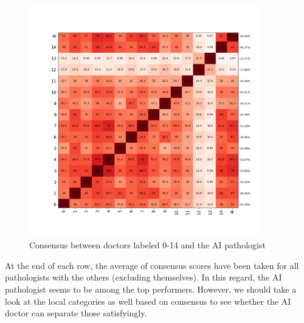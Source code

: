 \documentclass[a4paper,12pt]{article}
\begin{document}
\begin{figure}[H]
    \centering
    \includegraphics[width=0.9\textwidth]{results/consensus.png}
    \caption{Consensus between doctors labeled 0-14 and the AI pathologist}
    \label{fig:my_label}
\end{figure}

\vspace{4mm}

\par At the end of each row, the average of consensus scores have been taken for all pathologists with the others (excluding themselves). In this regard, the AI pathologist seems to be among the top performers. However, we should take a look at the local categories as well based on consensus to see whether the AI doctor can separate those satisfyingly.

\vspace{4mm}

\par 

\newpage



\end{document}
